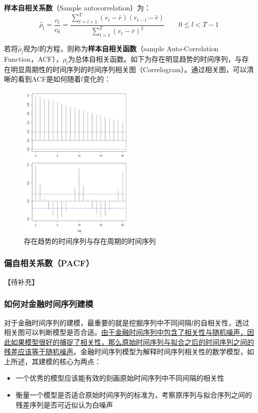 \documentclass[11pt]{article}
\begin{document}
\textbf{样本自相关系数}（Sample autocorrelation）为：
\begin{equation*}
    \hat{\rho}_l = \frac{c_l}{c_0} = \frac{\sum_{t=l+1}^{T}(r_t-\bar{r})(r_{t-l}-\bar{r})}{\sum_{t=1}^{T}(r_t-\bar{r})^2} \qquad 0 \leq l < T-1
\end{equation*}

若将$\hat{\rho}_l$视为$l$的方程，则称为\textbf{样本自相关函数}（sample Auto-Correlation Function，ACF），$\rho_l$为总体自相关函数。如下为存在明显趋势的时间序列，与存在明显周期性的时间序列的时间序列相关图（Correlogram）。通过相关图，可以清晰的看到ACF是如何随着$l$变化的：

\begin{figure}[H]
    \centering
    \includegraphics[width=0.5\textwidth]{fig/ts-trend.png}
    \caption{存在趋势的时间序列与存在周期的时间序列}
    \label{fig:ts-trend}
\end{figure}

\subsubsection{偏自相关系数（PACF）}

【待补充】

\subsubsection{如何对金融时间序列建模}

对于金融时间序列的建模，最重要的就是挖掘序列中不同间隔$l$的自相关性，透过相关图可以判断模型是否合适。\uline{由于金融时间序列中包含了相关性与随机噪声，因此如果模型很好的捕捉了相关性，那么原始时间序列与拟合之后的时间序列之间的残差应该等于随机噪声}。金融时间序列模型为解释时间序列相关性的数学模型，如上所述，其建模的核心为两点：
\begin{itemize}
    \item 一个优秀的模型应该能有效的刻画原始时间序列中不同间隔的相关性
    \item 衡量一个模型是否适合原始时间序列的标准为，考察原序列与拟合序列之间的残差序列是否可近似认为白噪声
\end{itemize}
\end{document}
